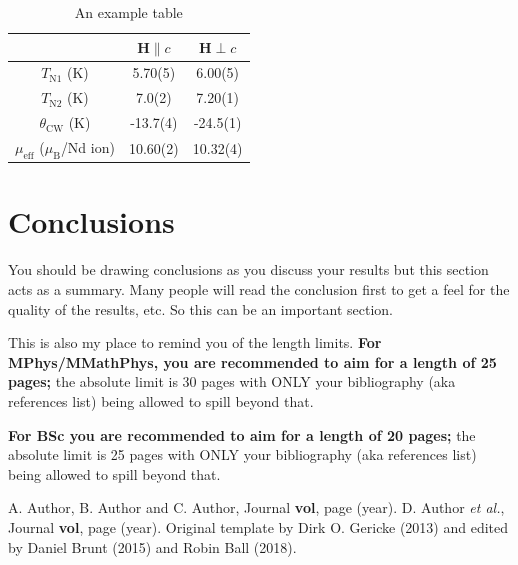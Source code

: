 \documentclass[a4paper,12pt, notitlepage]{article}
\begin{document}
\begin{table}[b]
\begin{tabular}{ c c c }
\hline 
 & $\mathbf{H} \parallel c$ & $\mathbf{H} \perp c$ \\ 
\hline 
$T_{\mathrm{N1}}$ (K) & 5.70(5) &  6.00(5) \\ 
$T_{\mathrm{N2}}$ (K) & 7.0(2) & 7.20(1) \\  
$\theta_{\mathrm{CW}}$ (K) & -13.7(4) & -24.5(1) \\  
$\mu_{\mathrm{eff}}$ ($\mu_{\mathrm{B}}$/Nd ion) & 10.60(2) & 10.32(4)  \\ 
\hline 
\end{tabular}
\caption{An example table}
\label{tab: tab_1}
\end{table} 


\section{Conclusions}
You should be drawing conclusions as you discuss your results but this section acts as a summary. Many people will read the conclusion first to get a feel for the quality of the results, etc. So this can be an important section.
 
This is also my place to remind you of the length limits.  {\bf For MPhys/MMathPhys, you are recommended to aim for a length of 25 pages;}  the absolute limit is 30 pages with ONLY your bibliography (aka references list) being allowed to spill beyond that. 

{\bf For BSc you are recommended to aim for a length of 20 pages;} the absolute limit is 25 pages with ONLY your bibliography (aka references list) being allowed to spill beyond that.



\small{
\begin{thebibliography}{99}

\setlength{\itemsep}{-2mm}

 A. Author, B. Author and C. Author,
                  Journal {\bf vol}, page (year).
 D. Author {\em et al.},
                  Journal {\bf vol}, page (year).
 Original template by Dirk O. Gericke (2013) and edited by Daniel Brunt (2015) and Robin Ball (2018).

\end{thebibliography}
}
\end{document}
